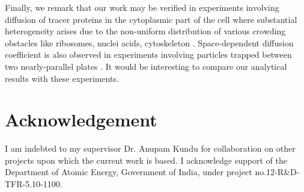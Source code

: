 \documentclass[showpacs,amsmath,amssymb,aps,pre,twocolumn,]{revtex4-1}
\def\greenw#1{{\color{black} #1}}
\begin{document}
\greenw{Finally, we remark that our work may be verified in experiments involving diffusion of tracer proteins in the cytoplasmic part of the cell where substantial heterogeneity arises due to the non-uniform distribution of various crowding obstacles like ribosomes, nuclei acids, cytoskeleton \cite{Kuhn2011}. Space-dependent diffusion coefficient is also observed in experiments involving particles trapped between two nearly-parallel plates \cite{Lancon2001}. It would be interesting to compare our analytical results with these experiments.}


\section{Acknowledgement}
I am indebted to my supervisor Dr. Anupam Kundu for collaboration on other projects upon which the current work is based. I acknowledge support of the Department of Atomic Energy, Government of India, under project no.12-R\&D-TFR-5.10-1100.


\appendix
\end{document}
